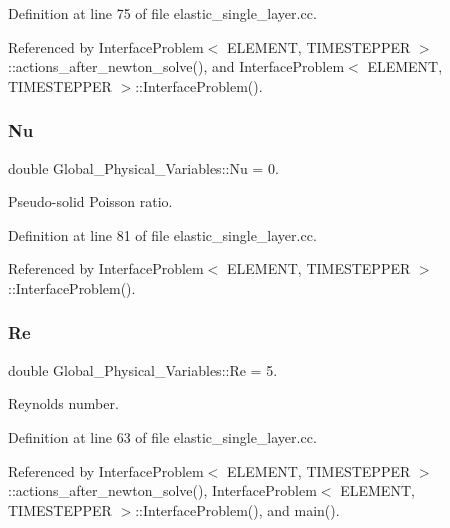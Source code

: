 Definition at line 75 of file elastic\+\_\+single\+\_\+layer.\+cc.



Referenced by Interface\+Problem$<$ E\+L\+E\+M\+E\+N\+T, T\+I\+M\+E\+S\+T\+E\+P\+P\+E\+R $>$\+::actions\+\_\+after\+\_\+newton\+\_\+solve(), and Interface\+Problem$<$ E\+L\+E\+M\+E\+N\+T, T\+I\+M\+E\+S\+T\+E\+P\+P\+E\+R $>$\+::\+Interface\+Problem().

\mbox{\label{namespaceGlobal__Physical__Variables_a3962c36313826b19f216f6bbbdd6a477}} 
\subsubsection{\texorpdfstring{Nu}{Nu}}
{\footnotesize\ttfamily double Global\+\_\+\+Physical\+\_\+\+Variables\+::\+Nu = 0.}



Pseudo-\/solid Poisson ratio. 



Definition at line 81 of file elastic\+\_\+single\+\_\+layer.\+cc.



Referenced by Interface\+Problem$<$ E\+L\+E\+M\+E\+N\+T, T\+I\+M\+E\+S\+T\+E\+P\+P\+E\+R $>$\+::\+Interface\+Problem().

\mbox{\label{namespaceGlobal__Physical__Variables_ab814e627d2eb5bc50318879d19ab16b9}} 
\subsubsection{\texorpdfstring{Re}{Re}}
{\footnotesize\ttfamily double Global\+\_\+\+Physical\+\_\+\+Variables\+::\+Re = 5.}



Reynolds number. 



Definition at line 63 of file elastic\+\_\+single\+\_\+layer.\+cc.



Referenced by Interface\+Problem$<$ E\+L\+E\+M\+E\+N\+T, T\+I\+M\+E\+S\+T\+E\+P\+P\+E\+R $>$\+::actions\+\_\+after\+\_\+newton\+\_\+solve(), Interface\+Problem$<$ E\+L\+E\+M\+E\+N\+T, T\+I\+M\+E\+S\+T\+E\+P\+P\+E\+R $>$\+::\+Interface\+Problem(), and main().


